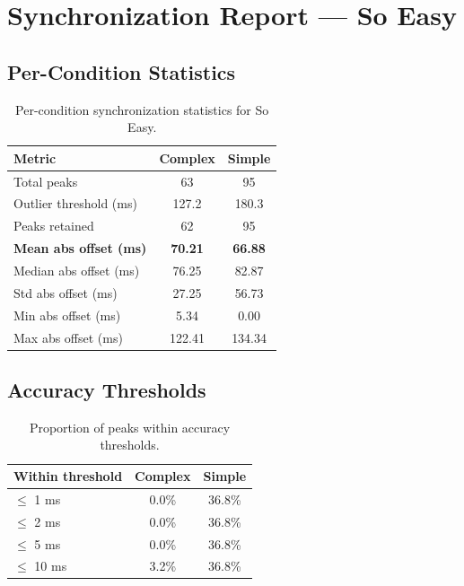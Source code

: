 
\section*{Synchronization Report --- So Easy}

\subsection*{Per-Condition Statistics}

\begin{table}[h!]
\centering
\begin{tabular}{|l|c|c|}
\hline
Metric & Complex & Simple \\
\hline
Total peaks & 63 & 95 \\
Outlier threshold (ms) & 127.2 & 180.3 \\
Peaks retained & 62 & 95 \\
\textbf{Mean abs offset (ms)} & \textbf{70.21} & \textbf{66.88} \\
Median abs offset (ms) & 76.25 & 82.87 \\
Std abs offset (ms) & 27.25 & 56.73 \\
Min abs offset (ms) & 5.34 & 0.00 \\
Max abs offset (ms) & 122.41 & 134.34 \\
\hline
\end{tabular}
\caption{Per-condition synchronization statistics for So Easy.}
\label{tab:sync_stats}
\end{table}

\subsection*{Accuracy Thresholds}

\begin{table}[h!]
\centering
\begin{tabular}{|l|c|c|}
\hline
Within threshold & Complex & Simple \\
\hline
$\leq$ 1 ms & 0.0\% & 36.8\% \\
$\leq$ 2 ms & 0.0\% & 36.8\% \\
$\leq$ 5 ms & 0.0\% & 36.8\% \\
$\leq$ 10 ms & 3.2\% & 36.8\% \\
\hline
\end{tabular}
\caption{Proportion of peaks within accuracy thresholds.}
\label{tab:sync_accuracy}
\end{table}

